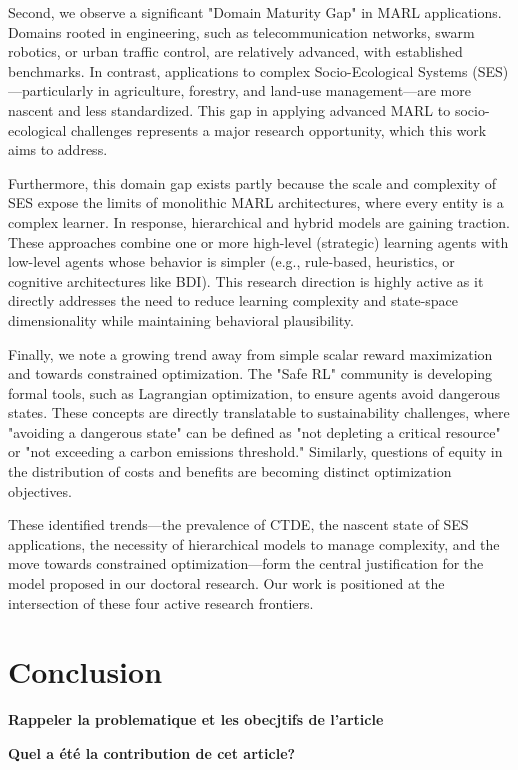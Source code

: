 \documentclass[conference]{IEEEtran}
\begin{document}
Second, we observe a significant "Domain Maturity Gap" in MARL applications. Domains rooted in engineering, such as telecommunication networks, swarm robotics, or urban traffic control, are relatively advanced, with established benchmarks. In contrast, applications to complex Socio-Ecological Systems (SES)---particularly in agriculture, forestry, and land-use management---are more nascent and less standardized. This gap in applying advanced MARL to socio-ecological challenges represents a major research opportunity, which this work aims to address.

Furthermore, this domain gap exists partly because the scale and complexity of SES expose the limits of monolithic MARL architectures, where every entity is a complex learner. In response, hierarchical and hybrid models are gaining traction. These approaches combine one or more high-level (strategic) learning agents with low-level agents whose behavior is simpler (e.g., rule-based, heuristics, or cognitive architectures like BDI). This research direction is highly active as it directly addresses the need to reduce learning complexity and state-space dimensionality while maintaining behavioral plausibility.

Finally, we note a growing trend away from simple scalar reward maximization and towards constrained optimization. The "Safe RL" community is developing formal tools, such as Lagrangian optimization, to ensure agents avoid dangerous states. These concepts are directly translatable to sustainability challenges, where "avoiding a dangerous state" can be defined as "not depleting a critical resource" or "not exceeding a carbon emissions threshold." Similarly, questions of equity in the distribution of costs and benefits are becoming distinct optimization objectives.

These identified trends---the prevalence of CTDE, the nascent state of SES applications, the necessity of hierarchical models to manage complexity, and the move towards constrained optimization---form the central justification for the model proposed in our doctoral research. Our work is positioned at the intersection of these four active research frontiers.

\section{Conclusion}

\textbf{Rappeler la problematique et les obecjtifs de l'article}

\textbf{Quel a été la contribution de cet article?}
\end{document}
